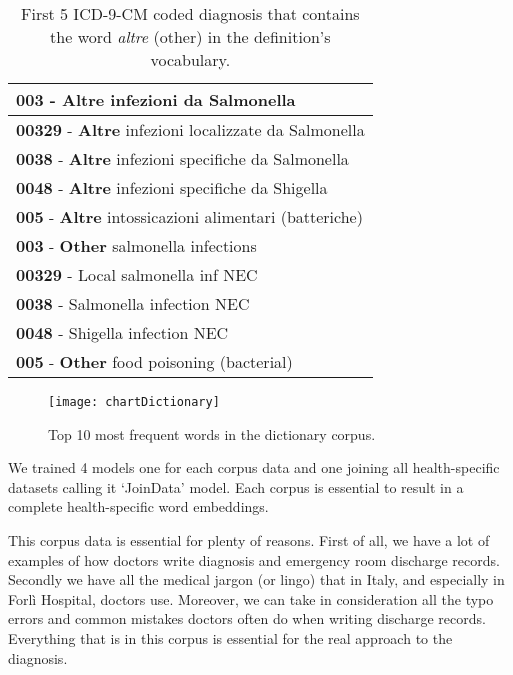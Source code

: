 \begin{table}[h!]
	\begin{center}  
		\caption[First 5 ICD-9-CM coded diagnosis that contains the word \textit{altre} (other)]{First 5 ICD-9-CM coded diagnosis that contains the word \textit{altre} (other) in the definition's vocabulary.} 
		\label{tab:tableICd9CMaltre}
		\begin{tabular}{|p{\linewidth}|} 
			\hline
			\textbf{003} - \textbf{Altre} infezioni da Salmonella	\\ \hline
			\textbf{00329} - \textbf{Altre} infezioni localizzate da Salmonella	\\ \hline
			\textbf{0038} - \textbf{Altre} infezioni specifiche da Salmonella	\\ \hline
			\textbf{0048} - \textbf{Altre} infezioni specifiche da Shigella	\\ \hline
			\textbf{005} - \textbf{Altre} intossicazioni alimentari (batteriche)	\\ \hline \hline
			\textbf{003} - \textbf{Other} salmonella infections	\\ \hline
			\textbf{00329} - Local salmonella inf NEC	\\ \hline
			\textbf{0038} - Salmonella infection NEC	\\ \hline
			\textbf{0048} - Shigella infection NEC \\ \hline
			\textbf{005} - \textbf{Other} food poisoning (bacterial)	\\ \hline
		\end{tabular} 
	\end{center}
\end{table}

\begin{figure}[ht]
	\centering
	\texttt{[image: chartDictionary]}
	\caption[Top 10 most frequent words in ICD-9-CM Dictionary]{Top 10 most frequent words in the dictionary corpus.}
	\label{fig:chartDictionary}
\end{figure}


We trained 4 models one for each corpus data and one joining all health-specific datasets calling it \enquote*{JoinData} model. Each corpus is essential to result in a complete health-specific word embeddings. 

This corpus data is essential for plenty of reasons. First of all, we have a lot of examples of how doctors write diagnosis and emergency room discharge records. Secondly we have all the medical jargon (or lingo) that in Italy, and especially in Forlì Hospital, doctors use. Moreover, we can take in consideration all the typo errors and common mistakes doctors often do when writing discharge records. Everything that is in this corpus is essential for the real approach to the diagnosis. 

